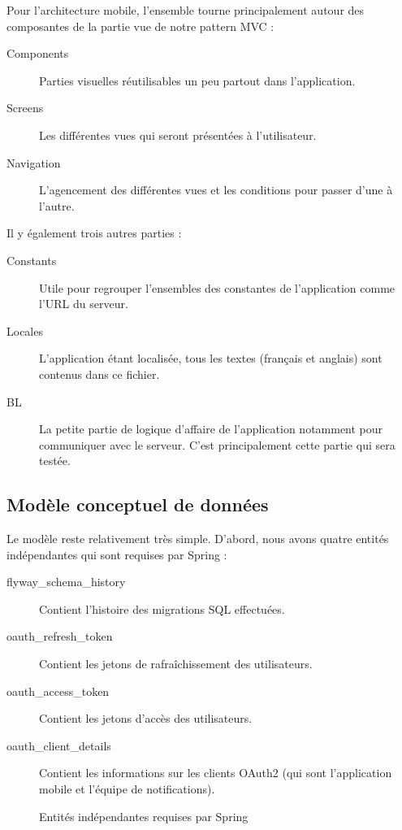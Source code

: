         Pour l'architecture mobile, l'ensemble tourne principalement autour des composantes de la partie vue de notre pattern MVC :
        \begin{description}
            \item[Components] Parties visuelles réutilisables un peu partout dans l'application.
            \item[Screens] Les différentes vues qui seront présentées à l'utilisateur.
            \item[Navigation] L'agencement des différentes vues et les conditions pour passer d'une à l'autre.
        \end{description}

        Il y également trois autres parties :
        \begin{description}
            \item[Constants] Utile pour regrouper l'ensembles des constantes de l'application comme l'URL du serveur.
            \item[Locales] L'application étant localisée, tous les textes (français et anglais) sont contenus dans ce fichier.
            \item[BL] La petite partie de logique d'affaire de l'application notamment pour communiquer avec le serveur. C'est principalement cette partie qui sera testée.
        \end{description}
    
    \subsection{Modèle conceptuel de données}
    Le modèle reste relativement très simple. D'abord, nous avons quatre entités indépendantes qui sont requises par Spring :
    \begin{description}
        \item[flyway\_schema\_history] Contient l'histoire des migrations SQL effectuées.
        \item[oauth\_refresh\_token] Contient les jetons de rafraîchissement des utilisateurs.
        \item[oauth\_access\_token] Contient les jetons d'accès des utilisateurs.
        \item[oauth\_client\_details] Contient les informations sur les clients OAuth2 (qui sont l'application mobile et l'équipe de notifications).
    \end{description}
    
    \begin{figure}[hp] \centering
        
        \caption{Entités indépendantes requises par Spring}
        \label{fig.entitesRequises}
    \end{figure}
    
